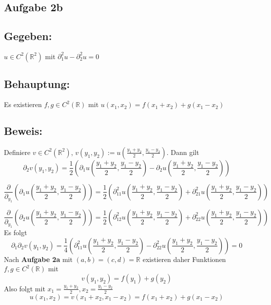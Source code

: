 \documentclass[a4paper, 12pt]{article} %
\begin{document}
\begin{flushleft}
        \QEDB


        \section*{Aufgabe 2b}

        \subsection*{Gegeben:}
        $u \in C^2(\mathbb{R}^2)$ mit $\partial^2_1u - \partial^2_2u = 0$

        \subsection*{Behauptung:}
        Es existieren $f, g \in C^2(\mathbb{R})$ mit $u(x_1,x_2) = f(x_1+x_2)+g(x_1-x_2)$

        \subsection*{Beweis:}
        Definiere $v \in C^2(\mathbb{R}^2)$, 
                  $v(y_1,y_2) := u(\frac{y_1+y_2}{2},\frac{y_1-y_2}{2})$. Dann gilt
        $$
        \partial_2 v(y_1,y_2) = \frac{1}{2} \left ( \partial_1 u(\frac{y_1+y_2}{2},\frac{y_1-y_2}{2})
                                - \partial_2 u(\frac{y_1+y_2}{2},\frac{y_1-y_2}{2}) \right )
        $$

        $$
        \frac{\partial}{\partial_{y_1}} \left (\partial_1 u(\frac{y_1+y_2}{2},\frac{y_1-y_2}{2}) \right )
                = \frac{1}{2} \left ( \partial^2_{11} u(\frac{y_1+y_2}{2},\frac{y_1-y_2}{2})
                + \partial^2_{21} u(\frac{y_1+y_2}{2},\frac{y_1-y_2}{2}) \right )
        $$

        $$
        \frac{\partial}{\partial_{y_1}} \left (\partial_2 u(\frac{y_1+y_2}{2},\frac{y_1-y_2}{2}) \right )
                = \frac{1}{2} \left ( \partial^2_{12} u(\frac{y_1+y_2}{2},\frac{y_1-y_2}{2})
                + \partial^2_{22} u(\frac{y_1+y_2}{2},\frac{y_1-y_2}{2}) \right )
        $$
        Es folgt
        $$
        \partial_1\partial_2 v(y_1,y_2) = \frac{1}{4} \left ( \partial^2_{11} u(\frac{y_1+y_2}{2},\frac{y_1-y_2}{2})
                                        - \partial^2_{22} u(\frac{y_1+y_2}{2},\frac{y_1-y_2}{2}) \right )
                                        = 0
        $$
        Nach \textbf{Aufgabe 2a} mit $(a,b)=(c,d)= \mathbb{R}$ existieren daher 
        Funktionen $f, g \in C^2(\mathbb{R})$ mit
        $$
        v(y_1,y_2)= f(y_1)+g(y_2)
        $$
        Also folgt mit $x_1=\frac{y_1+y_2}{2}, x_2=\frac{y_1-y_2}{2}$
        $$
        u(x_1,x_2)=v(x_1+x_2,x_1-x_2)=f(x_1+x_2)+g(x_1-x_2)
        $$


\end{flushleft}
\end{document}

